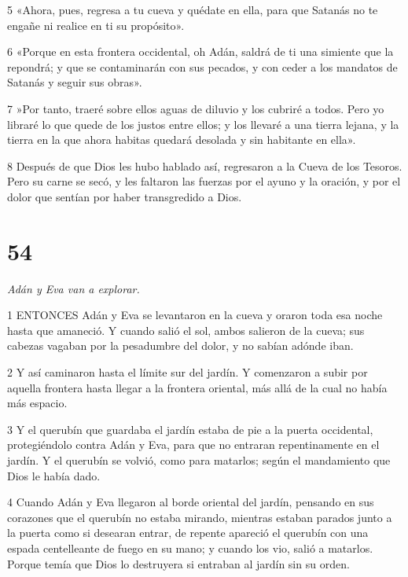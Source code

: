 \par 5 «Ahora, pues, regresa a tu cueva y quédate en ella, para que Satanás no te engañe ni realice en ti su propósito».

\par 6 «Porque en esta frontera occidental, oh Adán, saldrá de ti una simiente que la repondrá; y que se contaminarán con sus pecados, y con ceder a los mandatos de Satanás y seguir sus obras».

\par 7 »Por tanto, traeré sobre ellos aguas de diluvio y los cubriré a todos. Pero yo libraré lo que quede de los justos entre ellos; y los llevaré a una tierra lejana, y la tierra en la que ahora habitas quedará desolada y sin habitante en ella».

\par 8 Después de que Dios les hubo hablado así, regresaron a la Cueva de los Tesoros. Pero su carne se secó, y les faltaron las fuerzas por el ayuno y la oración, y por el dolor que sentían por haber transgredido a Dios.

\chapter{54}

\par \textit{Adán y Eva van a explorar.}

\par 1 ENTONCES Adán y Eva se levantaron en la cueva y oraron toda esa noche hasta que amaneció. Y cuando salió el sol, ambos salieron de la cueva; sus cabezas vagaban por la pesadumbre del dolor, y no sabían adónde iban.

\par 2 Y así caminaron hasta el límite sur del jardín. Y comenzaron a subir por aquella frontera hasta llegar a la frontera oriental, más allá de la cual no había más espacio.

\par 3 Y el querubín que guardaba el jardín estaba de pie a la puerta occidental, protegiéndolo contra Adán y Eva, para que no entraran repentinamente en el jardín. Y el querubín se volvió, como para matarlos; según el mandamiento que Dios le había dado.

\par 4 Cuando Adán y Eva llegaron al borde oriental del jardín, pensando en sus corazones que el querubín no estaba mirando, mientras estaban parados junto a la puerta como si desearan entrar, de repente apareció el querubín con una espada centelleante de fuego en su mano; y cuando los vio, salió a matarlos. Porque temía que Dios lo destruyera si entraban al jardín sin su orden.


